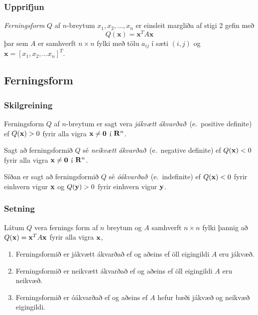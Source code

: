 \subsubsection{Upprifjun  }
{\em \color{red} Ferningsform} $Q$ af $n$-breytum $x_1,x_2,\ldots, x_n$ er einsleit margliða af stigi 2 gefin með 
\begin {equation*}
Q(\mathbf{x}) = \mathbf{x}^T A \mathbf{x}
\end {equation*}
þar sem $A$ er samhverft $n \times n$ fylki með tölu $a_{ij}$ í sæti $(i,j)$ og $\mathbf{x} = [x_1,x_2,\ldots x_n]^T$.







\subsection{Ferningsform} 

\subsubsection{Skilgreining  }
Ferningsform $Q$ af $n$-breytum er sagt vera
{\em \color{red} jákvætt ákvarðað}\  (e.~positive definite) ef $Q(\mbox{${\bf x}$})>0$ fyrir
alla vigra $\mbox{${\bf x}$}\neq \mbox{${\bf 0}$}$ í $\mbox{${\bf R}^n$}$.   

\medskip
Sagt að ferningsformið $Q$ sé
{\em \color{red} neikvætt ákvarðað}\  (e.~negative definite) ef $Q(\mbox{${\bf x}$})<0$ fyrir
alla vigra $\mbox{${\bf x}$}\neq \mbox{${\bf 0}$}$ í $\mbox{${\bf R}^n$}$.   

\medskip
Síðan er sagt að ferningsformið $Q$ sé
{\em  \color{red} óákvarðað}\  (e.~indefinite) ef $Q(\mbox{${\bf x}$})<0$ fyrir
einhvern vigur $\mbox{${\bf x}$}$  og $Q(\mbox{${\bf y}$})>0$ fyrir einhvern vigur
$\mbox{${\bf y}$}$. 




\subsubsection{Setning  }
 Látum $Q$ vera fernings form  af $n$ breytum og
$A$ samhverft $n\times n$ fylki þannig að $Q(\mbox{${\bf x}$})=\mbox{${\bf x}$}^TA\mbox{${\bf x}$}$ fyrir
alla vigra $\mbox{${\bf x}$}$,
\begin {enumerate}
 \item  Ferningsformið er jákvætt ákvarðað ef og aðeins ef öll eigingildi
    $A$ eru jákvæð.
\item Ferningsformið er neikvætt ákvarðað ef og aðeins ef öll eigingildi
    $A$ eru neikvæð.
\item  Ferningsformið er óákvarðað ef og aðeins ef $A$ hefur bæði jákvæð
     og neikvæð eigingildi.	
\end {enumerate}




